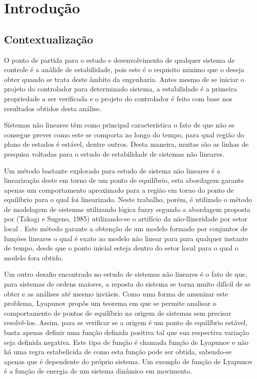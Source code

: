                      
\chapter{Introdução}\label{CapIntro}

\section{Contextualização}

O ponto de partida para o estudo e desenvolvimento de qualquer sistema de controle é a análide de estabilidade, pois este é o requisito minimo que o deseja obter quando se trata deste âmbito da engenharia. Antes mesmo de se iniciar o projeto do controlador para determinado sistema, a estabilidade é a primeira propriedade a ser verificada e o projeto do controlador é feito com base nos resultados obtidos desta análise.

Sistemas não lineares têm como principal característica o fato de que não se consegue prever como este se comporta ao longo do tempo, para qual região do plano de estados é estável, dentre outros. Desta maneira, muitas são as linhas de pesquisa voltadas para o estudo de estabilidade de sistemas não lineares.

Um método bastante explorado para estudo de sistema não lineares é a linearização deste em torno de um ponto de equilíbrio, esta abordagem garante apenas um comportamento aproximado para a região em torno do ponto de equilíbrio para o qual foi linearizado. Neste trabalho, porém, é utilizado o método de modelagem de sistemas utilizando lógica fuzzy \cite{article:zadeh:1990} segundo a abordagem proposta por (Takagi e Sugeno, 1985) \cite{articlets:1985} utilizando-se o artifício da não-llineridade por setor local \cite{booktw:2003}. Este método garante a obtenção de um modelo formado por conjuntos de funções lineares o qual é exato ao modelo não linear para para qualquer instante de tempo, desde que o ponto inicial esteja dentro do setor local para o qual o modelo fora obtido.

Um outro desafio encontrado no estudo de sistemas não lineares é o fato de que, para sistemas de ordens maiores, a reposta do sistema se torna muito difícil de se obter e as análises até mesmo inviáeis. Como uma forma de amenizar este problema, Lyapunov propôs um teorema em que se permite analisar o comportamento de pontos de equilíbrio na origem de sistemas sem precisar resolvê-los. Assim, para se verificar se a origem é um ponto de equilíbrio estável, basta apenas definir uma função definida positiva tal que sua respectiva variação seja definida negativa. Este tipo de função é chamada função de Lyapunov e não há uma regra estabelicida de como esta função pode ser obtida, sabendo-se apenas que é dependente do próprio sistema. Um exemplo de função de Lyapunov é a função de energia de um sistema dinâmico em movimento.

